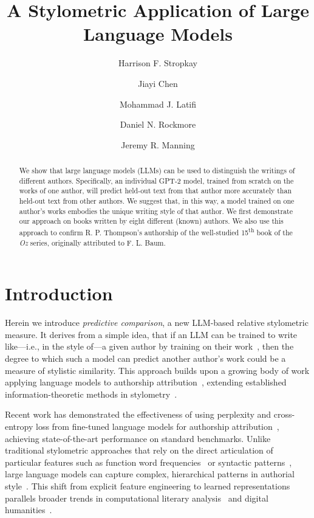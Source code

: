 \documentclass{llmxive}
\title{A Stylometric Application of Large Language Models}
\author{Harrison F. Stropkay \and Jiayi Chen \and Mohammad J. Latifi \and Daniel N. Rockmore \and Jeremy R. Manning}
\begin{document}
\maketitle
\begin{abstract}
We show that large language models (LLMs) can be used to distinguish the
writings of different authors. Specifically, an individual GPT-2 model, trained
from scratch on the works of one author, will predict held-out text from that
author more accurately than held-out text from other authors. We suggest that,
in this way, a model trained on one author's works embodies the unique writing
style of that author. We first demonstrate our approach on books written by
eight different (known) authors. We also use this approach to confirm R. P.
Thompson's authorship of the well-studied 15\textsuperscript{th} book of the
\textit{Oz} series, originally attributed to F. L. Baum.
\end{abstract}
\section{Introduction}

Herein we introduce {\em predictive comparison}, a new LLM-based relative
stylometric measure. It derives from a simple idea, that if an LLM can be
trained to write like---i.e., in the style of---a given author by training on
their work~\citep[e.g., ][]{Mikr25}, then the degree to which such a model can
predict another author's work could be a measure of stylistic similarity. This
approach builds upon a growing body of work applying language models to
authorship attribution~\citep{HuanEtal25,UcheEtal20}, extending established
information-theoretic methods in stylometry~\citep{JuolBaay05,ZhaoEtal06}.

Recent work has demonstrated the effectiveness of using perplexity and
cross-entropy loss from fine-tuned language models for authorship
attribution~\citep{HuanEtal25}, achieving state-of-the-art performance on
standard benchmarks. Unlike traditional stylometric approaches that rely on the
direct articulation of particular features such as function word
frequencies~\citep{MostWall63} or syntactic patterns~\citep{Holm98}, large
language models can capture complex, hierarchical patterns in authorial
style~\citep{FabiEtal20}. This shift from explicit feature engineering to
learned representations parallels broader trends in computational literary
analysis~\citep{More00,UndeEtal19} and digital humanities~\citep{HughEtal12}.
\end{document}
